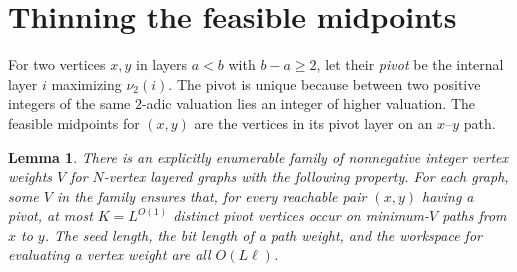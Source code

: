 \documentclass[11pt]{article}
\newtheorem{lemma}[theorem]{Lemma}
\begin{document}
\section{Thinning the feasible midpoints}

For two vertices $x,y$ in layers $a<b$ with $b-a\ge 2$, let their
\emph{pivot} be the internal layer $i$ maximizing $\nu_2(i)$.
The pivot is unique because between two positive integers of the same
$2$-adic valuation lies an integer of higher valuation. The feasible
midpoints for $(x,y)$ are the vertices in its pivot layer on an
$x$--$y$ path.

\begin{lemma}\label{lem:raw}
There is an explicitly enumerable family of nonnegative integer vertex
weights $V$ for $N$-vertex layered graphs with the following property.
For each graph, some $V$ in the family ensures that, for every reachable
pair $(x,y)$ having a pivot, at most $K=L^{O(1)}$ distinct pivot
vertices occur on minimum-$V$ paths from $x$ to $y$. The seed length,
the bit length of a path weight, and the workspace for evaluating a
vertex weight are all $O(L\ell)$.
\end{lemma}
\end{document}
